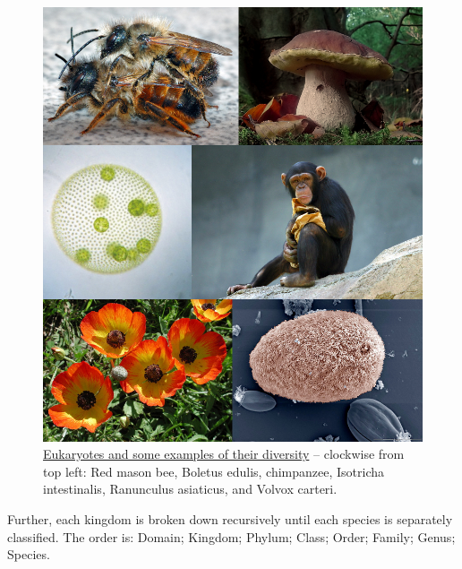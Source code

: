 \begin{figure}

{\centering \includegraphics[width=0.7\linewidth]{./figures/life/Eukaryota_diversity_2} 

}

\caption{\href{https://commons.wikimedia.org/wiki/File:Eukaryota_diversity_2.jpg}{Eukaryotes and some examples of their diversity} -- clockwise from top left: Red mason bee, Boletus edulis, chimpanzee, Isotricha intestinalis, Ranunculus asiaticus, and Volvox carteri.}\label{fig:eukaryotediversity}
\end{figure}

Further, each kingdom is broken down recursively until each species is separately classified. The order is: Domain; Kingdom; Phylum; Class; Order; Family; Genus; Species.



